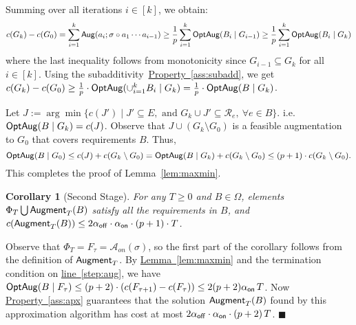 \documentclass[11pt,letterpaper]{article}
\newcommand{\lref}[2][]{\hyperref[#2]{#1~\ref*{#2}}}
\newtheorem{corollary}[theorem]{Corollary}
\newenvironment{proof}{

\noindent{\bf Proof:}} {\hfill$\blacksquare$


}
\def\a{\ensuremath{\mathcal{A}}\xspace}
\def\aug{{\sf Aug}}
\def\fst{\ensuremath {\Phi_T}\xspace}
\def\snd{\ensuremath {{\sf Augment}_T}\xspace}
\newcommand{\sse}{\subseteq}
\newcommand{\offline}{\alpha_{\sf off}}
\newcommand{\online}{\alpha_{\sf on}}
\newcommand{\optaug}{{\sf OptAug}}
\begin{document}
{Summing over all iterations $i\in [k]$, we obtain:
$$c(G_k)- c(G_0)= \sum_{i=1}^k \aug(a_i; \sigma \circ a_1\cdots a_{i-1}) \ge \frac{1}{p} \sum_{i=1}^k
  \optaug(B_i\mid G_{i-1})\ge \frac{1}{p} \sum_{i=1}^k \optaug(B_i\mid G_k)$$ where the last inequality follows from monotonicity since
  $G_{i-1}\sse G_k$ for all $i\in [k]$. Using the
  subadditivity~\lref[Property]{ass:subadd}, we get $c(G_k)- c(G_0)
  \ge \frac1p \cdot \optaug(\cup_{i=1}^k B_i\mid G_k) = \frac1p \cdot \optaug(B\mid G_k)$.

Let $J:= \arg\min \{c(J')\mid J'\sse E, \mbox{ and }G_k\cup J'\sse
  \mathcal{R}_e,~\forall e\in B\}$. i.e.  $\optaug(B\mid G_k)=c(J)$. Observe that
$J\cup (G_k\setminus G_0)$ is a feasible  augmentation to $G_0$ that covers requirements $B$. Thus,
$$\optaug(B\mid G_0) \le c(J) + c(G_k\setminus G_0) = \optaug(B\mid G_k) + c(G_k\setminus G_0) \le (p+1)\cdot c(G_k\setminus
G_0).$$ This completes the proof of Lemma~\ref{lem:maxmin}.

}

\begin{corollary}[Second Stage]\label{cor:mk-2nd}
  For any $T\ge 0$ and $B\in\Omega$, elements $\fst\bigcup \snd(B)$ satisfy all the requirements in $B$, and
  $c(\snd(B))\le 2\offline\cdot \online\cdot (p+1)\cdot T$.
\end{corollary}
\begin{proof}
Observe that $\fst=F_\tau=\a_{on}(\sigma)$, so the first part of the corollary follows from the definition of \snd.  By
\lref[Lemma]{lem:maxmin} and the termination condition on
  \lref[line]{step:aug}, we have $\optaug(B\mid F_\tau)\le (p+2)\cdot  (c(F_{\tau+1}) - c(F_{\tau})) \leq 2(p+2)\online\, T$. Now
  \lref[Property]{ass:apx} guarantees that the solution $\snd(B)$ found by this approximation algorithm has cost at most
$2\offline\cdot \online\cdot(p+2)\, T$.
  \end{proof}
\end{document}
